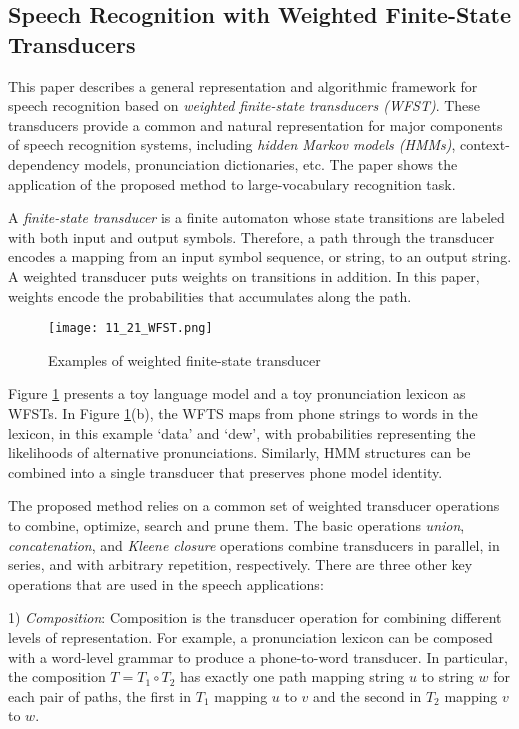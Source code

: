 \subsection{Speech Recognition with Weighted Finite-State Transducers \cite{Mohri2000}}

This paper describes a general representation and algorithmic framework for speech recognition based on \emph{weighted finite-state transducers (WFST)}. These transducers provide a common and natural representation for major components of speech recognition systems, including \emph{hidden Markov models (HMMs)}, context-dependency models, pronunciation dictionaries, etc. The paper shows the application of the proposed method to large-vocabulary recognition task.

A \emph{finite-state transducer} is a finite automaton whose state transitions are labeled with both input and output symbols. Therefore, a path through the transducer encodes a mapping from an input symbol sequence, or string, to an output string. A weighted transducer puts weights on transitions in addition. In this paper, weights encode the probabilities that accumulates along the path.

\begin{figure}[h]
  \centering
  \texttt{[image: 11\_21\_WFST.png]}\\
  \caption{Examples of weighted finite-state transducer}\label{fig:WFST}
\end{figure}

Figure \ref{fig:WFST} presents a toy language model and a toy pronunciation lexicon as WFSTs. In Figure \ref{fig:WFST}(b), the WFTS maps from phone strings to words in the lexicon, in this example `data' and `dew', with probabilities representing the likelihoods of alternative pronunciations. Similarly, HMM structures can be combined into a single transducer that preserves phone model identity.

The proposed method relies on a common set of weighted transducer operations to combine, optimize, search and prune them. The basic operations \emph{union}, \emph{concatenation}, and \emph{Kleene closure} operations combine transducers in parallel, in series, and with arbitrary repetition, respectively. There are three other key operations that are used in the speech applications:

1) \emph{Composition}: Composition is the transducer operation for combining different levels of representation. For example, a pronunciation lexicon can be composed with a word-level grammar to produce a phone-to-word transducer. In particular, the composition $T = T_1 \circ T_2$ has exactly one path mapping string $u$ to string $w$ for each pair of paths, the first in $T_1$ mapping $u$ to $v$ and the second in $T_2$ mapping $v$ to $w$.

